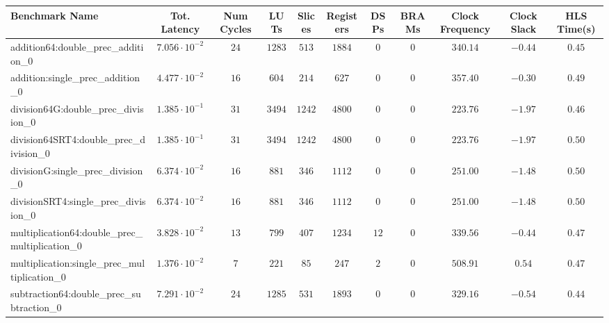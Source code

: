 \begin{tabular}{|l|c|c|c|c|c|c|c|c|c|c|}
\hline
Benchmark Name                                   & Tot. Latency            & Num Cycles & LUTs      & Slices   & Registers & DSPs   & BRAMs & Clock Frequency & Clock Slack & HLS Time(s) \\
\hline
addition64:double\_prec\_addition\_0             & $ 7.056 \cdot 10^{-2} $ & $ 24     $ & $ 1283  $ & $ 513  $ & $ 1884  $ & $ 0  $ & $ 0 $ & $ 340.14      $ & $ -0.44   $ & $ 0.45    $ \\
addition:single\_prec\_addition\_0               & $ 4.477 \cdot 10^{-2} $ & $ 16     $ & $ 604   $ & $ 214  $ & $ 627   $ & $ 0  $ & $ 0 $ & $ 357.40      $ & $ -0.30   $ & $ 0.49    $ \\
division64G:double\_prec\_division\_0            & $ 1.385 \cdot 10^{-1} $ & $ 31     $ & $ 3494  $ & $ 1242 $ & $ 4800  $ & $ 0  $ & $ 0 $ & $ 223.76      $ & $ -1.97   $ & $ 0.46    $ \\
division64SRT4:double\_prec\_division\_0         & $ 1.385 \cdot 10^{-1} $ & $ 31     $ & $ 3494  $ & $ 1242 $ & $ 4800  $ & $ 0  $ & $ 0 $ & $ 223.76      $ & $ -1.97   $ & $ 0.50    $ \\
divisionG:single\_prec\_division\_0              & $ 6.374 \cdot 10^{-2} $ & $ 16     $ & $ 881   $ & $ 346  $ & $ 1112  $ & $ 0  $ & $ 0 $ & $ 251.00      $ & $ -1.48   $ & $ 0.50    $ \\
divisionSRT4:single\_prec\_division\_0           & $ 6.374 \cdot 10^{-2} $ & $ 16     $ & $ 881   $ & $ 346  $ & $ 1112  $ & $ 0  $ & $ 0 $ & $ 251.00      $ & $ -1.48   $ & $ 0.50    $ \\
multiplication64:double\_prec\_multiplication\_0 & $ 3.828 \cdot 10^{-2} $ & $ 13     $ & $ 799   $ & $ 407  $ & $ 1234  $ & $ 12 $ & $ 0 $ & $ 339.56      $ & $ -0.44   $ & $ 0.47    $ \\
multiplication:single\_prec\_multiplication\_0   & $ 1.376 \cdot 10^{-2} $ & $ 7      $ & $ 221   $ & $ 85   $ & $ 247   $ & $ 2  $ & $ 0 $ & $ 508.91      $ & $ 0.54    $ & $ 0.47    $ \\
subtraction64:double\_prec\_subtraction\_0       & $ 7.291 \cdot 10^{-2} $ & $ 24     $ & $ 1285  $ & $ 531  $ & $ 1893  $ & $ 0  $ & $ 0 $ & $ 329.16      $ & $ -0.54   $ & $ 0.44    $ \\

\end{tabular}
